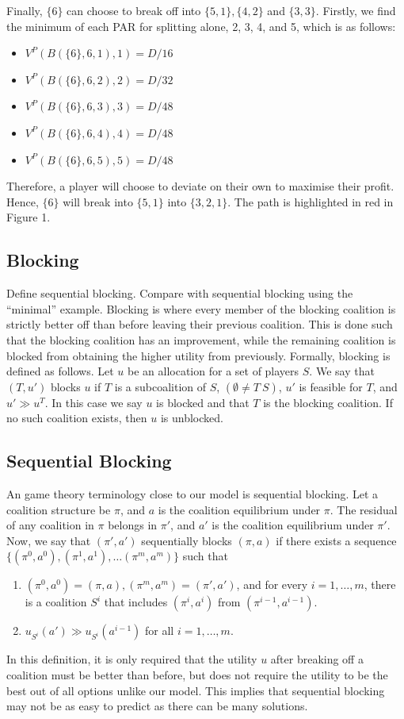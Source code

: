 \documentclass[sigconf,anonymous]{aamas}
\newcommand{\ykc}[1]{{\color{blue} #1}}
\begin{document}
Finally, $\{6\}$ can choose to break off into $\{5, 1\}, \{4, 2\}$ and $\{3, 3\}$. Firstly, we find the minimum of each PAR for splitting alone, 2, 3, 4, and 5, which is as follows: 
\begin{itemize}
	\item $V^P(B(\{6\}, 6, 1), 1) = D/16$
	\item $V^P(B(\{6\}, 6, 2), 2) = D/32$ 
	\item $V^P(B(\{6\}, 6, 3), 3) = D/48$
	\item $V^P(B(\{6\}, 6, 4), 4) = D/48$
	\item $V^P(B(\{6\}, 6, 5), 5) = D/48$
\end{itemize}
Therefore, a player will choose to deviate on their own to maximise their profit. Hence, $\{6\}$ will break into $\{5, 1\}$ into $\{3, 2, 1\}$. The path is highlighted in red in Figure 1. 

\subsection{Blocking}

\ykc{Define sequential blocking. Compare with sequential blocking using the ``minimal'' example.}
Blocking is where every member of the blocking coalition is strictly better off than before leaving their previous coalition. This is done such that the blocking coalition has an improvement, while the remaining coalition is blocked from obtaining the higher utility from previously. Formally, blocking is defined as follows. Let $u$ be an allocation for a set of players $S$. We say that $(T, u')$ blocks $u$ if $T$ is a subcoalition of $S$, $(\emptyset \neq T \ S)$, $u'$ is feasible for $T$, and $u' \gg u^T$. In this case we say $u$ is blocked and that $T$ is the blocking coalition. If no such coalition exists, then $u$ is unblocked.  

\subsection{Sequential Blocking} 
An game theory terminology close to our model is sequential blocking. Let a coalition structure be $\pi$, and $a$ is the coalition equilibrium under $\pi$. The residual of any coalition in $\pi$ belongs in $\pi'$, and $a'$ is the coalition equilibrium under $\pi'$. Now, we say that $(\pi', a')$ sequentially blocks $(\pi, a)$ if there exists a sequence $\{(\pi^0, a^0), (\pi^1, a^1), \dots (\pi^m, a^m)\}$ such that 
\begin{enumerate}
	\item $(\pi^0, a^0) = (\pi, a), (\pi^m, a^m) = (\pi', a')$, and for every $i = 1, \dots, m$, there is a coalition $S^i$ that includes $(\pi^i, a^i)$ from $(\pi^{i-1}, a^{i-1})$. 
	\item $u_{S^i}(a')\gg u_{S^i}(a^{i-1})$ for all $i = 1, \dots, m$. 
\end{enumerate}
In this definition, it is only required that the utility $u$ after breaking off a coalition must be better than before, but does not require the utility to be the best out of all options unlike our model. This implies that sequential blocking may not be as easy to predict as there can be many solutions. 
\end{document}
